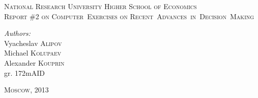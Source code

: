 \begin{titlepage}

\begin{center}
	\textsc{\Large National Research University Higher School of Economics}\\[8cm]

	\textsc{\large Report \#2 on Computer~Exercises on Recent~Advances~in~Decision~Making}\\[8cm]
\end{center}

\begin{flushright}
	\emph{Authors:}\\
	Vyacheslav \textsc{Alipov}\\
	Michael \textsc{Kolupaev}\\
	Alexander \textsc{Kouprin}\\
	gr. 172mAID
\end{flushright}

\vfill

\begin{center}
	\textsc{\large Moscow, 2013}
\end{center}

\end{titlepage}
